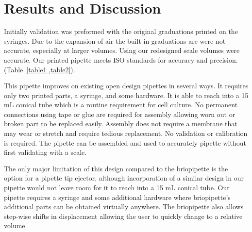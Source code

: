 \documentclass[10pt,letterpaper]{article}
\begin{document}
\section*{Results and Discussion}

Initially validation was preformed with the original graduations printed on the syringes.
Due to the expansion of air the built in graduations are were not accurate, especially at larger volumes.
Using our redesigned scale volumes were accurate.
Our printed pipette meets ISO standards for accuracy and precision. (Table~\ref{table1 ,table2}).

This pipette improves on existing open design pipettes in several ways. 
It requires only two printed parts, a syringe, and some hardware.
It is able to reach into a 15 mL conical tube which is a routine requirement for cell culture.
No permanent connections using tape or glue are required for assembly allowing worn out or broken part to be replaced easily.
Assembly does not require a membrane that may wear or stretch and require tedious replacement.
No validation or calibration is required.
The pipette can be assembled and used to accurately pipette without first validating with a scale.

The only major limitation of this design compared to the briopipette is the option for a pipette tip ejector, although incorporation of a similar design in our pipette would not leave room for it to reach into a 15 mL conical tube. 
Our pipette requires a syringe and some additional hardware where briopipette's additional parts can be obtained virtually anywhere.
The briopipette also allows step-wise shifts in displacement allowing the user to quickly change to a relative volume
\end{document}
